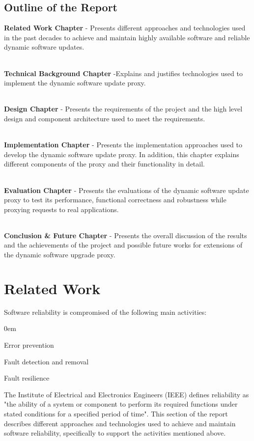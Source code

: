 \documentclass[a4paper,11pt,twoside]{report}
\begin{document}
\section{Outline of the Report}
\textbf{Related Work Chapter} - Presents different approaches and technologies used in the past decades to achieve and maintain highly available software and reliable dynamic software updates. 

\noindent \\
\textbf{Technical Background Chapter} -Explains and justifies technologies used to implement the dynamic software update proxy.

\noindent \\
\textbf{ Design Chapter} - Presents the requirements of the project and the high level design and component architecture used to meet the requirements.

\noindent \\
\textbf{Implementation Chapter} - Presents the implementation approaches used to develop the dynamic software update proxy. In addition, this chapter explains different components of the proxy and their functionality in detail.  

\noindent \\
\textbf{Evaluation Chapter} - Presents the evaluations of the dynamic software update proxy to test its performance, functional correctness and robustness while proxying requests to real applications. 

\noindent \\
\textbf{Conclusion \& Future Chapter} - Presents the overall discussion of the results and the achievements of the project and possible future works for extensions of the dynamic software upgrade proxy. 

\chapter{Related Work}
Software reliability is compromised of the following main activities:

  \begin{list}{-}{}
  \itemsep0em
  \item Error prevention 
  
  \item Fault detection and removal
  
  \item Fault resilience
  \end{list}

\noindent
The Institute of Electrical and Electronics Engineers (IEEE) defines reliability as "the ability of a system or component to perform its required functions under stated conditions for a specified period of time". 
This section of the report describes different approaches and technologies used to achieve and maintain software reliability, specifically to support the activities mentioned above. 
\end{document}
